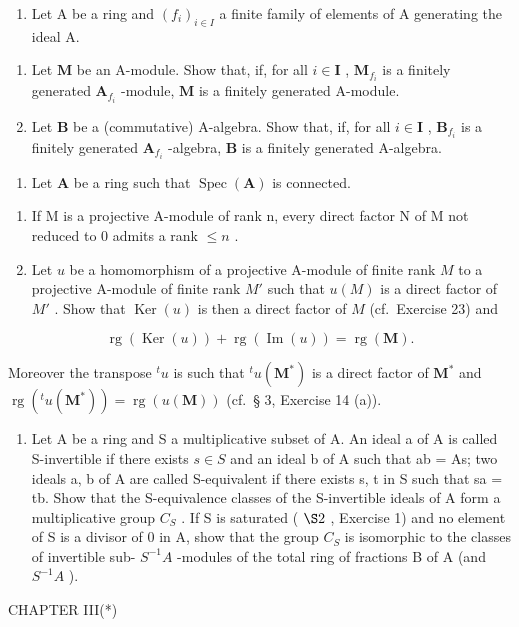 \begin{enumerate}
\def\labelenumi{\arabic{enumi}.}
\setcounter{enumi}{22}
\tightlist
\item
  Let A be a ring and \((f_i)_{i\in I}\) a finite family of elements of A generating the ideal A.
\end{enumerate}

\begin{enumerate}
\def\labelenumi{(\alph{enumi})}
\item
  Let \(\mathbf{M}\) be an A-module. Show that, if, for all \(i\in \mathbf{I}\) , \(\mathbf{M}_{f_i}\) is a finitely generated \(\mathbf{A}_{f_i}\) -module, \(\mathbf{M}\) is a finitely generated A-module.
\item
  Let \(\mathbf{B}\) be a (commutative) A-algebra. Show that, if, for all \(i\in \mathbf{I}\) , \(\mathbf{B}_{f_i}\) is a finitely generated \(\mathbf{A}_{f_i}\) -algebra, \(\mathbf{B}\) is a finitely generated A-algebra.
\end{enumerate}

\begin{enumerate}
\def\labelenumi{\arabic{enumi}.}
\setcounter{enumi}{23}
\tightlist
\item
  Let \(\mathbf{A}\) be a ring such that \(\operatorname{Spec}(\mathbf{A})\) is connected.
\end{enumerate}

\begin{enumerate}
\def\labelenumi{(\alph{enumi})}
\item
  If M is a projective A-module of rank n, every direct factor N of M not reduced to 0 admits a rank \(\leqslant n\) .
\item
  Let \(u\) be a homomorphism of a projective A-module of finite rank \(M\) to a projective A-module of finite rank \(M'\) such that \(u(M)\) is a direct factor of \(M'\) . Show that \(\operatorname{Ker}(u)\) is then a direct factor of \(M\) (cf.~Exercise 23) and
\end{enumerate}

\[
\operatorname{rg} (\operatorname{Ker} (u)) + \operatorname{rg} (\operatorname{Im} (u)) = \operatorname{rg} (\mathbf {M}).
\]

Moreover the transpose \({}^t u\) is such that \({}^t u(\mathbf{M}^*)\) is a direct factor of \(\mathbf{M}^*\) and \(\operatorname{rg}({}^t u(\mathbf{M}^*)) = \operatorname{rg}(u(\mathbf{M}))\) (cf.~§ 3, Exercise 14 (a)).

\begin{enumerate}
\def\labelenumi{\arabic{enumi}.}
\setcounter{enumi}{24}
\tightlist
\item
  Let A be a ring and S a multiplicative subset of A. An ideal a of A is called S-invertible if there exists \(s \in S\) and an ideal b of A such that ab = As; two ideals a, b of A are called S-equivalent if there exists s, t in S such that sa = tb. Show that the S-equivalence classes of the S-invertible ideals of A form a multiplicative group \(C_{S}\) . If S is saturated ( \(\S 2\) , Exercise 1) and no element of S is a divisor of 0 in A, show that the group \(C_{S}\) is isomorphic to the classes of invertible sub- \(S^{-1}A\) -modules of the total ring of fractions B of A (and \(S^{-1}A\) ).
\end{enumerate}

CHAPTER III(*)


